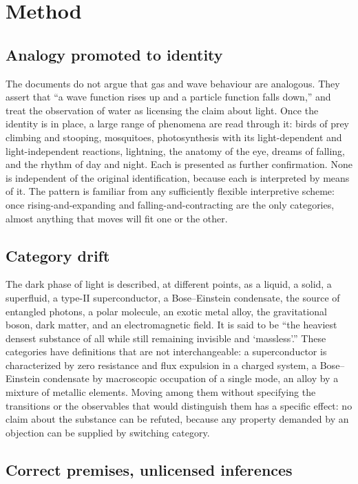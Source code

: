 \documentclass[11pt]{article}
\begin{document}
\section{Method}

\subsection{Analogy promoted to identity}

The documents do not argue that gas and wave behaviour are analogous. They assert that ``a wave function rises up and a particle function falls down,'' and treat the observation of water as licensing the claim about light. Once the identity is in place, a large range of phenomena are read through it: birds of prey climbing and stooping, mosquitoes, photosynthesis with its light-dependent and light-independent reactions, lightning, the anatomy of the eye, dreams of falling, and the rhythm of day and night. Each is presented as further confirmation. None is independent of the original identification, because each is interpreted by means of it. The pattern is familiar from any sufficiently flexible interpretive scheme: once rising-and-expanding and falling-and-contracting are the only categories, almost anything that moves will fit one or the other.

\subsection{Category drift}

The dark phase of light is described, at different points, as a liquid, a solid, a superfluid, a type-II superconductor, a Bose--Einstein condensate, the source of entangled photons, a polar molecule, an exotic metal alloy, the gravitational boson, dark matter, and an electromagnetic field. It is said to be ``the heaviest densest substance of all while still remaining invisible and `massless'.'' These categories have definitions that are not interchangeable: a superconductor is characterized by zero resistance and flux expulsion in a charged system, a Bose--Einstein condensate by macroscopic occupation of a single mode, an alloy by a mixture of metallic elements. Moving among them without specifying the transitions or the observables that would distinguish them has a specific effect: no claim about the substance can be refuted, because any property demanded by an objection can be supplied by switching category.

\subsection{Correct premises, unlicensed inferences}
\end{document}

